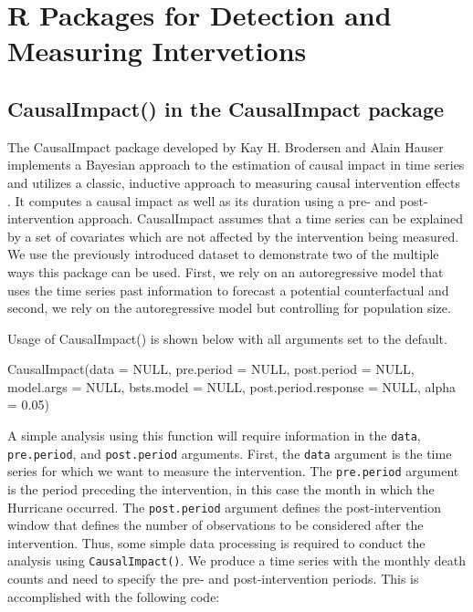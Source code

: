 \documentclass[12pt]{article}
\newenvironment{Shaded}{\begin{snugshade}}{\end{snugshade}}
\newcommand{\AttributeTok}[1]{\textcolor[rgb]{0.77,0.63,0.00}{#1}}
\newcommand{\ConstantTok}[1]{\textcolor[rgb]{0.00,0.00,0.00}{#1}}
\newcommand{\FloatTok}[1]{\textcolor[rgb]{0.00,0.00,0.81}{#1}}
\newcommand{\FunctionTok}[1]{\textcolor[rgb]{0.00,0.00,0.00}{#1}}
\newcommand{\NormalTok}[1]{#1}
\begin{document}
\hypertarget{r-packages-for-detection-and-measuring-intervetions}{%
\section{R Packages for Detection and Measuring
Intervetions}\label{r-packages-for-detection-and-measuring-intervetions}}

\hypertarget{causalimpact-in-the-causalimpact-package}{%
\subsection{CausalImpact() in the CausalImpact
package}\label{causalimpact-in-the-causalimpact-package}}

The \textsf{CausalImpact} package developed by Kay H. Brodersen and
Alain Hauser implements a Bayesian approach to the estimation of causal
impact in time series and utilizes a classic, inductive approach to
measuring causal intervention effects \citep{brodersen2015inferring}. It
computes a causal impact as well as its duration using a pre- and
post-intervention approach. \textsf{CausalImpact} assumes that a time
series can be explained by a set of covariates which are not affected by
the intervention being measured. We use the previously introduced
dataset to demonstrate two of the multiple ways this package can be
used. First, we rely on an autoregressive model that uses the time
series past information to forecast a potential counterfactual and
second, we rely on the autoregressive model but controlling for
population size.

Usage of \textsf{CausalImpact()} is shown below with all arguments set
to the default.

\begin{Shaded}
\begin{Highlighting}[]
\FunctionTok{CausalImpact}\NormalTok{(}\AttributeTok{data =} \ConstantTok{NULL}\NormalTok{, }\AttributeTok{pre.period =} \ConstantTok{NULL}\NormalTok{, }\AttributeTok{post.period =} \ConstantTok{NULL}\NormalTok{, }
             \AttributeTok{model.args =} \ConstantTok{NULL}\NormalTok{,  }\AttributeTok{bsts.model =} \ConstantTok{NULL}\NormalTok{, }
             \AttributeTok{post.period.response =} \ConstantTok{NULL}\NormalTok{, }\AttributeTok{alpha =} \FloatTok{0.05}\NormalTok{)}
\end{Highlighting}
\end{Shaded}

A simple analysis using this function will require information in the
\texttt{data}, \texttt{pre.period}, and \texttt{post.period} arguments.
First, the \texttt{data} argument is the time series for which we want
to measure the intervention. The \texttt{pre.period} argument is the
period preceding the intervention, in this case the month in which the
Hurricane occurred. The \texttt{post.period} argument defines the
post-intervention window that defines the number of observations to be
considered after the intervention. Thus, some simple data processing is
required to conduct the analysis using \texttt{CausalImpact()}. We
produce a time series with the monthly death counts and need to specify
the pre- and post-intervention periods. This is accomplished with the
following code:
\end{document}

